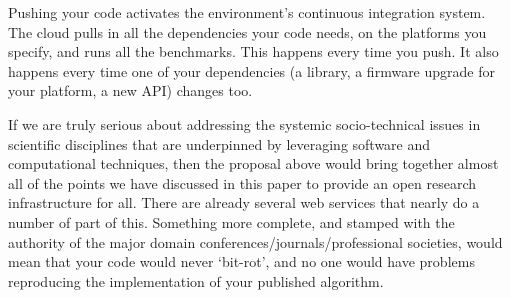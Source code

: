 \documentclass[10pt,conference,final]{IEEEtran}
\begin{document}
Pushing your code activates the environment's continuous integration
system.  The cloud pulls in all the dependencies your code needs, on
the platforms you specify, and runs all the benchmarks. This happens
every time you push. It also happens every time one of your
dependencies (a library, a firmware upgrade for your platform, a new
API) changes too.

If we are truly serious about addressing the systemic socio-technical
issues in scientific disciplines that are underpinned by leveraging
software and computational techniques, then the proposal above would
bring together almost all of the points we have discussed in this
paper to provide an open research infrastructure for all. There are
already several web services that nearly do a number of part of
this. Something more complete, and stamped with the authority of the
major domain conferences/journals/professional societies, would mean
that your code would never `bit-rot', and no one would have problems
reproducing the implementation of your published algorithm.






\end{document}
